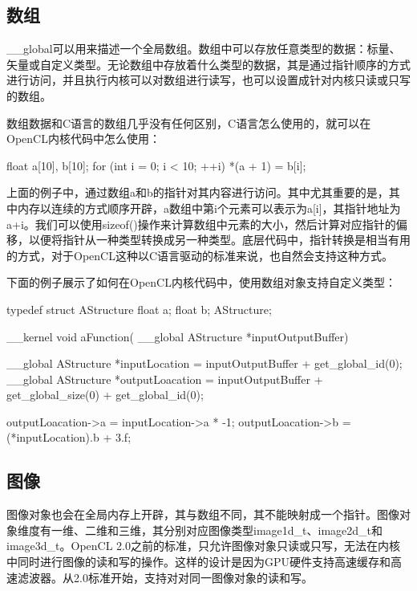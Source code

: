 \subsection{数组}

\_\allowbreak{}\_\allowbreak{}global可以用来描述一个全局数组。数组中可以存放任意类型的数据：标量、矢量或自定义类型。无论数组中存放着什么类型的数据，其是通过指针顺序的方式进行访问，并且执行内核可以对数组进行读写，也可以设置成针对内核只读或只写的数组。

数组数据和C语言的数组几乎没有任何区别，C语言怎么使用的，就可以在OpenCL内核代码中怎么使用：

\begin{codebox}[cpp]
float a[10], b[10];
for (int i = 0; i < 10; ++i){
  *(a + 1) = b[i];
}
\end{codebox}

上面的例子中，通过数组a和b的指针对其内容进行访问。其中尤其重要的是，其中内存以连续的方式顺序开辟，a数组中第i个元素可以表示为a[i]，其指针地址为a+i。我们可以使用sizeof()操作来计算数组中元素的大小，然后计算对应指针的偏移，以便将指针从一种类型转换成另一种类型。底层代码中，指针转换是相当有用的方式，对于OpenCL这种以C语言驱动的标准来说，也自然会支持这种方式。

下面的例子展示了如何在OpenCL内核代码中，使用数组对象支持自定义类型：

\begin{codebox}[cpp]
typedef struct AStructure{
  float a;
  float b;
}AStructure;

__kernel void aFunction(
  __global AStructure *inputOutputBuffer){

  __global AStructure *inputLocation =
    inputOutputBuffer + get_global_id(0);
  __global AStructure *outputLoacation =
    inputOutputBuffer + get_global_size(0) + get_global_id(0);

  outputLoacation->a = inputLocation->a * -1;
  outputLoacation->b = (*inputLocation).b + 3.f;
}
\end{codebox}

\subsection{图像}

图像对象也会在全局内存上开辟，其与数组不同，其不能映射成一个指针。图像对象维度有一维、二维和三维，其分别对应图像类型image1d\_\allowbreak{}t、image2d\_\allowbreak{}t和image3d\_\allowbreak{}t。OpenCL 2.0之前的标准，只允许图像对象只读或只写，无法在内核中同时进行图像的读和写的操作。这样的设计是因为GPU硬件支持高速缓存和高速滤波器。从2.0标准开始，支持对对同一图像对象的读和写。

